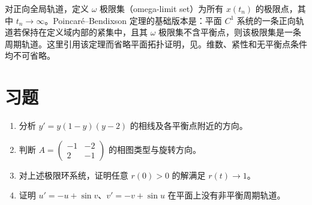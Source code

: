 对正向全局轨道，定义 $\omega$ 极限集（omega-limit set）为所有 $x(t_n)$ 的极限点，其中 $t_n\to\infty$。Poincaré--Bendixson 定理的基础版本是：平面 $C^1$ 系统的一条正向轨道若保持在定义域内部的紧集中，且其 $\omega$ 极限集不含平衡点，则该极限集是一条周期轨道。这里引用该定理而省略平面拓扑证明，见\cite[第7章]{teschl-ode}。维数、紧性和无平衡点条件均不可省略。

\section{习题}
\begin{enumerate}
 \item\label{ex:ode-phase} 分析 $y'=y(1-y)(y-2)$ 的相线及各平衡点附近的方向。
 \item\label{ex:ode-spiral} 判断 $A=\begin{pmatrix}-1&-2\\2&-1\end{pmatrix}$ 的相图类型与旋转方向。
 \item 对上述极限环系统，证明任意 $r(0)>0$ 的解满足 $r(t)\to1$。
 \item 证明 $u'=-u+\sin v$、$v'=-v+\sin u$ 在平面上没有非平衡周期轨道。
\end{enumerate}

